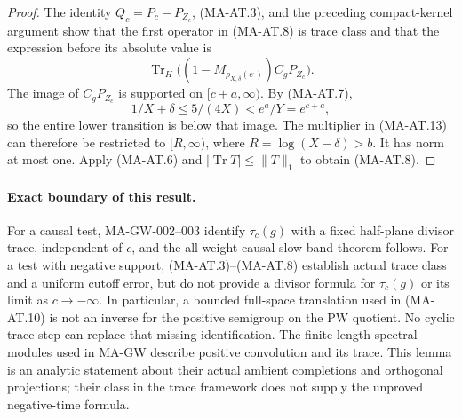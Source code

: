 \begin{proof}
The identity \(Q_c=P_c-P_{Z_c}\), (MA-AT.3), and the preceding
compact-kernel argument show that the first operator in (MA-AT.8)
is trace class and that the expression before its absolute value is
\[
 \operatorname{Tr}_H
     \bigl((1-M_{\rho_{X,\delta}(e^\cdot)})C_gP_{Z_c}\bigr).
 \tag{MA-AT.13}
\]
The image of \(C_gP_{Z_c}\) is supported on \([c+a,\infty)\).
By (MA-AT.7),
\[
 1/X+\delta\le5/(4X)<e^a/Y=e^{c+a},
 \]
so the entire lower transition is below that image.
The multiplier in (MA-AT.13) can therefore be restricted to
\([R,\infty)\), where \(R=\log(X-\delta)>b\).
It has norm at most one.  Apply (MA-AT.6) and
\(|\operatorname{Tr}T|\le\|T\|_1\) to obtain (MA-AT.8).
\end{proof}

\paragraph{Exact boundary of this result.}
For a causal test, MA-GW-002--003 identify \(\tau_c(g)\) with a
fixed half-plane divisor trace, independent of \(c\), and the
all-weight causal slow-band theorem follows.
For a test with negative support, (MA-AT.3)--(MA-AT.8) establish
actual trace class and a uniform cutoff error, but do not provide
a divisor formula for \(\tau_c(g)\) or its limit as \(c\to-\infty\).
In particular, a bounded full-space translation used in
(MA-AT.10) is not an inverse for the positive semigroup on the
PW quotient.  No cyclic trace step can replace that missing
identification.
The finite-length spectral modules used in MA-GW describe
positive convolution and its trace.  This lemma is an analytic
statement about their actual ambient completions and orthogonal
projections; their class in the trace framework does not supply
the unproved negative-time formula.
